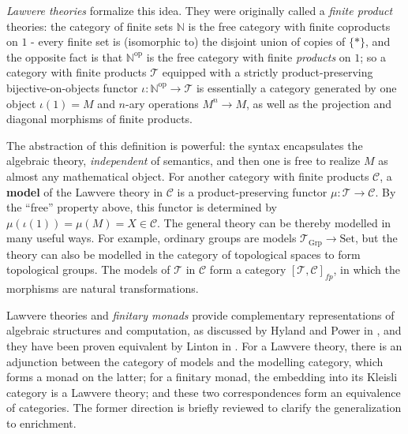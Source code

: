 \documentclass[a4paper,UKenglish]{article}
\theoremstyle{definition}
\newcommand{\Set}{\mathrm{Set}}
\newcommand{\Grp}{\mathrm{Grp}}
\newcommand{\op}{\mathrm{op}}
\newcommand{\NN}{\mathbb{N}}
\newcommand{\C}{\mathscr{C}}
\newcommand{\T}{\mathscr{T}}
\begin{document}
\textit{Lawvere theories} formalize this idea. They were originally called a \textit{finite product} theories: the category of finite sets $\NN$ is the free category with finite coproducts on $1$ - every finite set is (isomorphic to) the disjoint union of copies of $\{*\}$, and the opposite fact is that $\NN^\op$ is the free category with finite \textit{products} on $1$; so a category with finite products $\T$ equipped with a strictly product-preserving bijective-on-objects functor $\iota:\NN^\op \to \T$ is essentially a category generated by one object $\iota(1) = M$ and $n$-ary operations $M^n \to M$, as well as the projection and diagonal morphisms of finite products.

The abstraction of this definition is powerful: the syntax encapsulates the algebraic theory, \textit{independent} of semantics, and then one is free to realize $M$ as almost any mathematical object. For another category with finite products $\C$, a \textbf{model} of the Lawvere theory in $\C$ is a product-preserving functor $\mu: \T \to \C$. By the ``free'' property above, this functor is determined by $\mu(\iota(1)) = \mu(M) = X \in \C$. The general theory can be thereby modelled in many useful ways. For example, ordinary groups are models $\T_\Grp \to \Set$, but the theory can also be modelled in the category of topological spaces to form topological groups. The models of $\T$ in $\C$ form a category $[\T,\C]_{fp}$, in which the morphisms are natural transformations. 

Lawvere theories and \textit{finitary monads} provide complementary representations of algebraic structures and computation, as discussed by Hyland and Power in \cite{ltam}, and they have been proven equivalent by Linton in \cite{linton}. For a Lawvere theory, there is an adjunction between the category of models and the modelling category, which forms a monad on the latter; for a finitary monad, the embedding into its Kleisli category is a Lawvere theory; and these two correspondences form an equivalence of categories. The former direction is briefly reviewed to clarify the generalization to enrichment.
\end{document}
